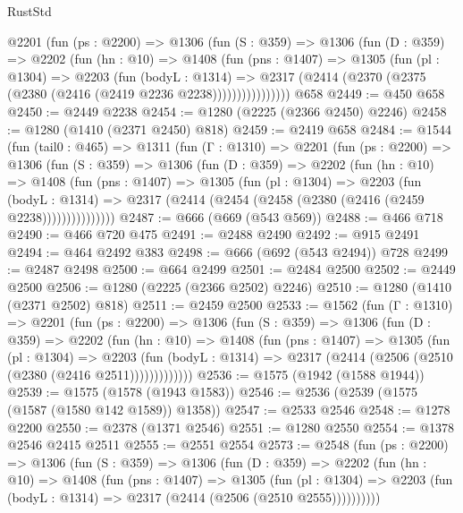 \begin{lexlean}{RustStd}
\begin{coremodule}
{\begin{coremodule}
{{{{{{{{{{{{        @2201
          (fun (ps : @2200) =>
          @1306
            (fun (S : @359) =>
            @1306
              (fun (D : @359) =>
              @2202
                (fun (hn : @10) =>
                @1408
                  (fun (pns : @1407) =>
                  @1305
                    (fun (pl : @1304) =>
                    @2203
                      (fun (bodyL : @1314) =>
                      @2317 (@2414 (@2370 (@2375 (@2380 (@2416 (@2419 @2236 @2238))))))))))))))))
    @658
@2449 := @450 @658
@2450 := @2449 @2238
@2454 := @1280 (@2225 (@2366 @2450) @2246)
@2458 := @1280 (@1410 (@2371 @2450) @818)
@2459 := @2419 @658
@2484 := @1544
    (fun (tail0 : @465) =>
    @1311
      (fun (Γ : @1310) =>
      @2201
        (fun (ps : @2200) =>
        @1306
          (fun (S : @359) =>
          @1306
            (fun (D : @359) =>
            @2202
              (fun (hn : @10) =>
              @1408
                (fun (pns : @1407) =>
                @1305
                  (fun (pl : @1304) =>
                  @2203
                    (fun (bodyL : @1314) =>
                    @2317 (@2414 (@2454 (@2458 (@2380 (@2416 (@2459 @2238)))))))))))))))
@2487 := @666 (@669 (@543 @569))
@2488 := @466 @718
@2490 := @466 @720 @475
@2491 := @2488 @2490
@2492 := @915 @2491
@2494 := @464 @2492 @383
@2498 := @666 (@692 (@543 @2494)) @728
@2499 := @2487 @2498
@2500 := @664 @2499
@2501 := @2484 @2500
@2502 := @2449 @2500
@2506 := @1280 (@2225 (@2366 @2502) @2246)
@2510 := @1280 (@1410 (@2371 @2502) @818)
@2511 := @2459 @2500
@2533 := @1562
    (fun (Γ : @1310) =>
    @2201
      (fun (ps : @2200) =>
      @1306
        (fun (S : @359) =>
        @1306
          (fun (D : @359) =>
          @2202
            (fun (hn : @10) =>
            @1408
              (fun (pns : @1407) =>
              @1305
                (fun (pl : @1304) =>
                @2203
                  (fun (bodyL : @1314) =>
                  @2317 (@2414 (@2506 (@2510 (@2380 (@2416 @2511)))))))))))))
@2536 := @1575 (@1942 (@1588 @1944))
@2539 := @1575 (@1578 (@1943 @1583))
@2546 := @2536 (@2539 (@1575 (@1587 (@1580 @142 @1589)) @1358))
@2547 := @2533 @2546
@2548 := @1278 @2200
@2550 := @2378 (@1371 @2546)
@2551 := @1280 @2550
@2554 := @1378 @2546 @2415 @2511
@2555 := @2551 @2554
@2573 := @2548
    (fun (ps : @2200) =>
    @1306
      (fun (S : @359) =>
      @1306
        (fun (D : @359) =>
        @2202
          (fun (hn : @10) =>
          @1408
            (fun (pns : @1407) =>
            @1305
              (fun (pl : @1304) =>
              @2203 (fun (bodyL : @1314) => @2317 (@2414 (@2506 (@2510 @2555))))))))))
}}}}}}}}}}}}
\end{coremodule}}
\end{coremodule}
\end{lexlean}
